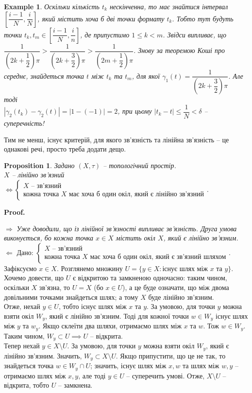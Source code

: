 \documentclass[a4paper, 10pt]{article}
\makeatletter
\def\rightproof{$\boxed{\Rightarrow}$ }
\def\leftproof{$\boxed{\Leftarrow}$ }
\theoremstyle{theoremdd}
\newtheorem{example}[theorem]{Example}
\newtheorem{proposition}[theorem]{Proposition}
\renewenvironment{proof}[1][Proof.\\]{\par
\pushQED{\hfill \qed}%
\normalfont \topsep6\p@\@plus6\p@\relax
\trivlist
\item\relax
{\bfseries
#1\@addpunct{.}}\hspace\labelsep\ignorespaces
}{%
\popQED\endtrivlist\@endpefalse
}
\makeatother
\begin{document}
\begin{example}
Оскільки кількість $t_k$ нескінченна, то має знайтися інтервал $\left[ \dfrac{i-1}{N}, \dfrac{i}{N} \right]$, який містить хоча б дві точки формату $t_k$. Тобто тут будуть точки $t_k, t_m \in \left[ \dfrac{i-1}{N}, \dfrac{i}{n} \right]$, де припустимо $1 \leq k < m$. Звідси випливає, що $\dfrac{1}{\left( 2k + \dfrac{1}{2} \right) \pi} > \dfrac{1}{\left( 2k + \dfrac{3}{2} \right) \pi} > \dfrac{1}{\left( 2m + \dfrac{1}{2} \right) \pi}$. Знову за теоремою Коші про середнє, знайдеться точка $t$ між $t_k$ та $t_m$, для якої $\gamma_1(t) = \dfrac{1}{\left( 2k + \dfrac{3}{2}\right)\pi}$. Але тоді\\
$\left| \gamma_2(t_k) - \gamma_2(t) \right| = |1-(-1)| = 2$, при цьому $|t_k-t| \leq \dfrac{1}{N} < \delta$ -- суперечність!
\end{example}

\noindent Тим не менш, існує критерій, для якого зв'язність та лінійна зв'язність -- це однакові речі, просто треба додати дещо.

\begin{proposition}
Задано $(X,\tau)$ -- топологічний простір.\\
$X$ -- лінійно зв'язний $\iff \begin{cases} X \text{ -- зв'язний} \\ \text{кожна точка $X$ має хоча б один окіл, який є лінійно зв'язний} \end{cases}$.
\end{proposition}

\begin{proof}
\rightproof \textit{Уже доводили, що із лінійної зв'язності випливає зв'язність. Друга умова виконується, бо кожна точка $x \in X$ містить окіл $X$, який є лінійно зв'язним.}
\bigskip \\
\leftproof Дано: $\begin{cases} X \text{ -- зв'язний} \\ \text{кожна точка $X$ має хоча б один окіл, який є зв'язний шляхом} \end{cases}$.\\
Зафіксуємо $x \in X$. Розглянемо множину $U = \{y \in X: \text{існує шлях між $x$ та $y$}\}$. Хочемо довести, що $U$ є відкритою та замкненою одночасно: таким чином, оскільки $X$ зв'язна, то $U = X$ (бо $x \in U$), а це буде означати, що між двома довільними точками знайдеться шлях; а тому $X$ буде лінійно зв'язним.\\
Отже, нехай $y \in U$, тобто існує шлях між $x$ та $y$. За умовою, для точки $y$ можна взяти окіл $W_y$, який є лінійно зв'язним. Тоді для кожної точки $w \in W_y$ існує шлях між $y$ та $w_y$. Якщо склеїти два шляхи, отримаємо шлях між $x$ та $w$. Тож $w \in W_y$. Таким чином, $W_y \subset U \implies U$ -- відкрита.\\
Тепер нехай $y \in X \setminus U$. За умовою, для точки $y$ можна взяти окіл $W_y$, який є лінійно зв'язним. Значить, $W_y \subset X \setminus U$. Якщо припустити, що це не так, то знайдеться точка $w \in W_y \cap U$; значить, існує шлях між $x,w$ та шлях між $w,y$ -- отримаємо шлях між $x,y$, але тоді $y \in U$ -- суперечить умові. Отже, $X \setminus U$ -- відкрита, тобто $U$ -- замкнена.
\end{proof}
\end{document}
